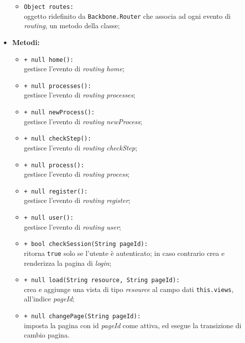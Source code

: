 \begin{flushleft}
\begin{itemize}
\begin{sloppypar}
\begin{itemize}
\item \texttt{Object routes:}\\ oggetto ridefinito da \texttt{Backbone.Router} che associa ad ogni evento di \textit{routing}, un metodo della classe;
\end{itemize}
\end{sloppypar}
\item \textbf{Metodi:}
\begin{sloppypar}
\begin{itemize}
\item \texttt{+ null home():}\\ gestisce l'evento di \textit{routing home};
\item \texttt{+ null processes():}\\ gestisce l'evento di \textit{routing processes};
\item \texttt{+ null newProcess():}\\ gestisce l'evento di \textit{routing newProcess};
\item \texttt{+ null checkStep():}\\ gestisce l'evento di \textit{routing checkStep};
\item \texttt{+ null process():}\\ gestisce l'evento di \textit{routing process};
\item \texttt{+ null register():}\\ gestisce l'evento di \textit{routing register};
\item \texttt{+ null user():}\\ gestisce l'evento di \textit{routing user};
\item \texttt{+ bool checkSession(String pageId):}\\ ritorna \texttt{true} solo se l'utente è autenticato; in caso contrario crea e renderizza la pagina di \textit{login};
\item \texttt{+ null load(String resource, String pageId):}\\ crea e aggiunge una vista di tipo \textit{resource} al campo dati \texttt{this.views}, all'indice \textit{pageId};
\item \texttt{+ null changePage(String pageId):}\\ imposta la pagina con id \textit{pageId} come attiva, ed esegue la transizione di cambio pagina.
\end{itemize}
\end{sloppypar}
\end{itemize}
\end{flushleft}

